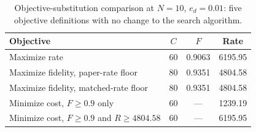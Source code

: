\begin{table}[ht]
    \centering
    \small
    \begin{tabular}{lccc}
        \hline
        Objective & $C$ & $F$ & Rate \\
        \hline
        Maximize rate & 60 & 0.9063 & 6195.95 \\
        Maximize fidelity, paper-rate floor & 80 & 0.9351 & 4804.58 \\
        Maximize fidelity, matched-rate floor & 80 & 0.9351 & 4804.58 \\
        Minimize cost, $F \ge 0.9$ only & 60 & --- & 1239.19 \\
        Minimize cost, $F \ge 0.9$ and $R \ge 4804.58$ & 60 & --- & 6195.95 \\
        \hline
    \end{tabular}

    \caption[Objective-substitution comparison]{Objective-substitution comparison at $N=10$, $e_d=0.01$: five objective definitions with no change to the search algorithm.}
    \label{tab:app:objectives}
\end{table}